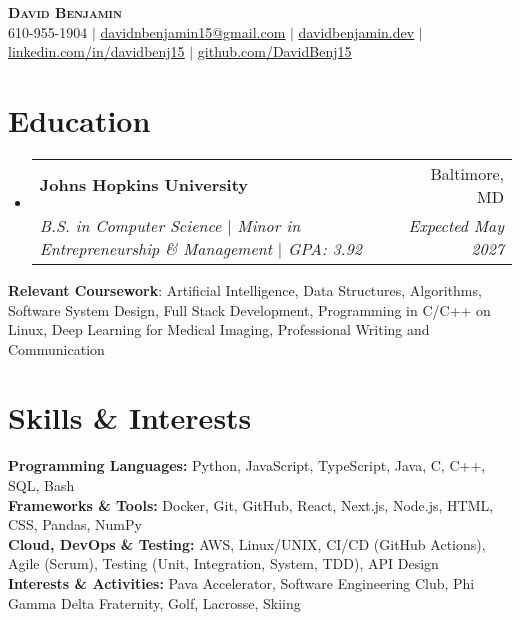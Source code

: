 \documentclass[letterpaper,10pt]{article}
\makeatletter
\newcommand{\resumeItem}[1]{
  \item\small{
    {#1 \vspace{-2pt}}
  }
}
\newcommand{\resumeSubheading}[4]{
  \vspace{-2pt}\item
    \begin{tabular*}{0.97\textwidth}[t]{l@{\extracolsep{\fill}}r}
      \textbf{#1} & #2 \\
      \textit{\small#3} & \textit{\small #4} \\
    \end{tabular*}\vspace{-7pt}
}
\newcommand{\resumeSubHeadingListStart}{\begin{itemize}[leftmargin=0.15in, label={}]}
\newcommand{\resumeSubHeadingListEnd}{\end{itemize}}
\newcommand{\resumeItemListStart}{\begin{itemize}}
\newcommand{\resumeItemListEnd}{\end{itemize}\vspace{-5pt}}
\makeatother
\begin{document}
\begin{center}
    \textbf{\Huge \scshape David Benjamin} \\ \vspace{1pt}
    \small 610-955-1904 $|$ \href{mailto:davidnbenjamin15@gmail.com}{\underline{davidnbenjamin15@gmail.com}} $|$ 
    \href{https://davidbenjamin.dev}{\underline{davidbenjamin.dev}} $|$
    \href{https://www.linkedin.com/in/davidbenj15/}{\underline{linkedin.com/in/davidbenj15}} $|$
    \href{https://github.com/DavidBenj15}{\underline{github.com/DavidBenj15}}
\end{center}

\section{Education}
  \resumeSubHeadingListStart
    \resumeSubheading
      {Johns Hopkins University}{Baltimore, MD}
      {B.S. in Computer Science $|$ Minor in Entrepreneurship \& Management $|$ GPA: 3.92}{Expected May 2027}
  \resumeSubHeadingListEnd


    \begin{itemize}[leftmargin=0.15in, label={}]
    \small{
        \item{
            \textbf{Relevant Coursework}: Artificial Intelligence, Data Structures, Algorithms, Software System Design, Full Stack Development, Programming in C/C++ on Linux, Deep Learning for Medical Imaging, Professional Writing and Communication
        }
    }
\end{itemize}

\section{Skills \& Interests}
\begin{itemize}[leftmargin=0.15in, label={}]
    \small{
        \item{
            \textbf{Programming Languages:} Python, JavaScript, TypeScript, Java, C, C++, SQL, Bash \\
            \textbf{Frameworks \& Tools:} Docker, Git, GitHub, React, Next.js, Node.js, HTML, CSS, Pandas, NumPy \\
            \textbf{Cloud, DevOps \& Testing:} AWS, Linux/UNIX, CI/CD (GitHub Actions), Agile (Scrum), Testing (Unit, Integration, System, TDD), API Design \\
            \textbf{Interests \& Activities:} Pava Accelerator, Software Engineering Club, Phi Gamma Delta Fraternity, Golf, Lacrosse, Skiing
        }
    }
\end{itemize}
\end{document}
